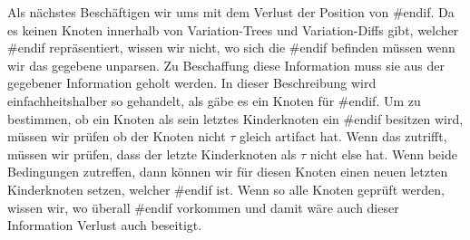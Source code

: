 Als nächstes Beschäftigen wir ums mit dem  Verlust der Position von \#endif. Da es keinen Knoten innerhalb von Variation-Trees und Variation-Diffs gibt, welcher \#endif repräsentiert, wissen wir nicht, wo sich die \#endif befinden müssen wenn wir das gegebene unparsen. Zu Beschaffung diese Information muss sie aus der gegebener Information geholt werden. In dieser Beschreibung wird einfachheitshalber so gehandelt, als gäbe es ein Knoten für \#endif.  Um zu bestimmen, ob ein Knoten als sein letztes Kinderknoten ein \#endif besitzen wird, müssen wir prüfen ob der Knoten nicht $\tau$ gleich artifact hat. Wenn das zutrifft, müssen wir prüfen, dass der letzte Kinderknoten als $\tau$ nicht else hat. Wenn beide Bedingungen zutreffen, dann können wir für diesen Knoten einen neuen letzten Kinderknoten setzen, welcher \#endif ist. Wenn so alle Knoten geprüft werden, wissen wir, wo überall \#endif vorkommen und damit wäre auch dieser Information Verlust auch beseitigt.\\

